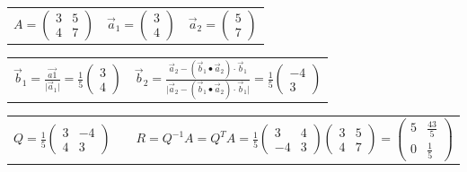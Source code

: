 \begin{tabular}{lll}
	$A = 
	\begin{pmatrix}
		3 & 5 \\ 4 & 7 
	\end{pmatrix}$ 
	&
	$\vec{a}_1 = 
	\begin{pmatrix}
		3 \\ 4 
	\end{pmatrix}$ 
	&
	$\vec{a}_2 = 
	\begin{pmatrix} 
		5 \\ 7
	\end{pmatrix}$
\end{tabular}
		
\vspace{0.2cm}
		
\begin{tabular}{ll}
	$\vec{b}_1 = \frac{\vec{a1}}{\vert \vec{a}_1 \vert} = \frac{1}{5} \begin{pmatrix} 3 \\ 4 \end{pmatrix} $
	&
	$\vec{b}_2 = \frac{\vec{a}_2 - (\vec{b}_1 \bullet \vec{a}_2) \cdot \vec{b}_1}
	{\vert \vec{a}_2 - (\vec{b}_1 \bullet \vec{a}_2) \cdot \vec{b}_1 \vert} = \frac{1}{5} \begin{pmatrix} -4 \\ 3 \end{pmatrix} $ 
\end{tabular}
		
\vspace{0.2cm}

\renewcommand{\arraystretch}{1.2}
\begin{tabular}{lll}
	$Q = \frac{1}{5} \begin{pmatrix} 3 & -4 \\ 4 & 3 \end{pmatrix} $
	& &
	$R = Q^{-1} A = Q^T A = \frac{1}{5}\begin{pmatrix} 3 & 4 \\ -4 & 3 \end{pmatrix}  \begin{pmatrix} 3 & 5 \\ 4 & 7 \end{pmatrix} =
	\begin{pmatrix} 5 & \frac{43}{5} \\ 0 & \frac{1}{5}  \end{pmatrix} $
\end{tabular}
\renewcommand{\arraystretch}{1}

\pagebreak
